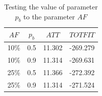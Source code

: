     \begin{table}[H]
    \centering
    \begin{tabular}{|c|c||c|c|}
    \hline
    $AF$ & $p_b$ & $ATT$ & $TOTFIT$\\
    \hline
    10\% & 0.5 & 11.302 & -269.279 \\
    10\% & 0.9 & 11.314 & -269.631 \\
    25\% & 0.5 & 11.366 & -272.392 \\
    25\% & 0.9 & 11.314 & -271.524 \\
    \hline
    \end{tabular}
    \caption {Testing the value of parameter $p_b$ to the parameter $AF$}
    \label{table:pb_testing}
    \end{table}




